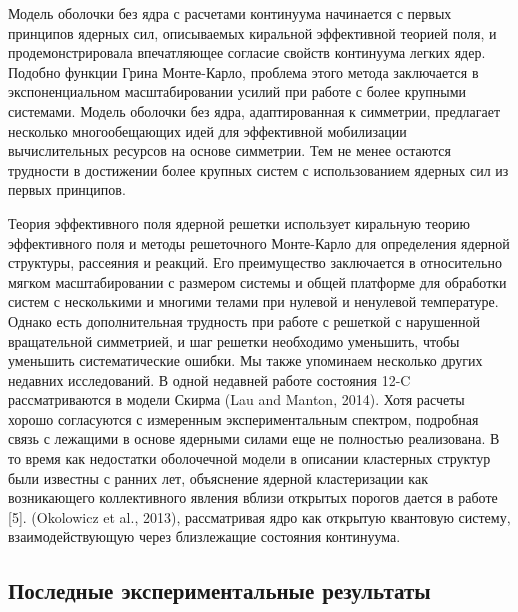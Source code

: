 \documentclass[fontsize=14pt]{scrarticle}
\begin{document}
Модель оболочки без ядра с расчетами континуума начинается с первых принципов ядерных сил, описываемых киральной эффективной теорией поля, и продемонстрировала впечатляющее согласие свойств континуума легких ядер. Подобно функции Грина Монте-Карло, проблема этого метода заключается в экспоненциальном масштабировании усилий при работе с более крупными системами. Модель оболочки без ядра, адаптированная к симметрии, предлагает несколько многообещающих идей для эффективной мобилизации вычислительных ресурсов на основе симметрии. Тем не менее остаются трудности в достижении более крупных систем с использованием ядерных сил из первых принципов.

Теория эффективного поля ядерной решетки использует киральную теорию эффективного поля и методы решеточного Монте-Карло для определения ядерной структуры, рассеяния и реакций. Его преимущество заключается в относительно мягком масштабировании с размером системы и общей платформе для обработки систем с несколькими и многими телами при нулевой и ненулевой температуре. Однако есть дополнительная трудность при работе с решеткой с нарушенной вращательной симметрией, и шаг решетки необходимо уменьшить, чтобы уменьшить систематические ошибки.
Мы также упоминаем несколько других недавних исследований. В одной недавней работе состояния 12-C рассматриваются в модели Скирма (Lau and Manton, 2014). Хотя расчеты хорошо согласуются с измеренным экспериментальным спектром, подробная связь с лежащими в основе ядерными силами еще не полностью реализована. В то время как недостатки оболочечной модели в описании кластерных структур были известны с ранних лет, объяснение ядерной кластеризации как возникающего коллективного явления вблизи открытых порогов дается в работе [5]. (Okolowicz et al., 2013), рассматривая ядро как открытую квантовую систему, взаимодействующую через близлежащие состояния континуума.


\subsection{ Последные экспериментальные результаты}
\end{document}

